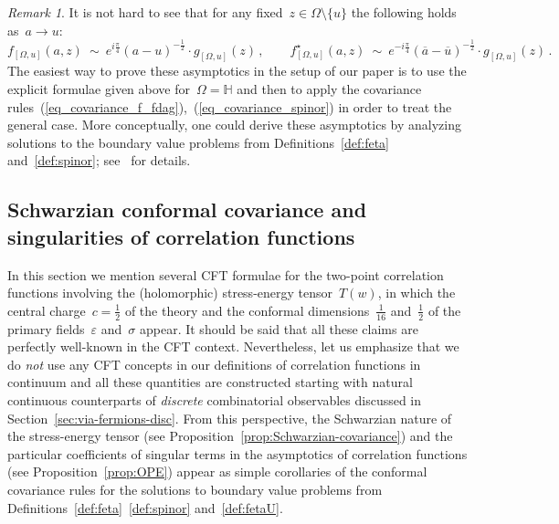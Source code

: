 \documentclass[reqno,11pt,a4paper]{amsart}
\theoremstyle{remark}
\newtheorem{remark}[proposition]{Remark}
\renewcommand{\H}{\mathbb{H}}
\newcommand{\OmegaU}{{[\Omega,u]}}
\newcommand{\fU}{f_\OmegaU}
\newcommand{\fstarU}{f^\star_\OmegaU}
\newcommand{\spinor}{g_\OmegaU}
\begin{document}
\begin{remark}
\label{rem:f_fdag_to_g}
It is not hard to see that for any fixed~$z\in\Omega\setminus\{u\}$ the following holds as~$a\to u$:
\[
\fU(a,z)\ \sim \ e^{i\frac{\pi}{4}}(a-u)^{-\frac{1}{2}}\cdot \spinor(z)\,,\qquad
\fstarU(a,z)\ \sim \ e^{-i\frac{\pi}{4}}(\overline{a}-\overline{u})^{-\frac{1}{2}}\cdot \spinor(z)\,.
\]
The easiest way to prove these asymptotics in the setup of our paper is to use the explicit formulae given above for~\mbox{$\Omega=\H$} and then to apply the covariance rules~(\ref{eq_covariance_f_fdag}),~(\ref{eq_covariance_spinor}) in order to treat the general case. More conceptually, one could derive these asymptotics by analyzing solutions to the boundary value problems from Definitions~\ref{def:feta} and~\ref{def:spinor}; see~\cite{CheHonIzy21} for details.
\end{remark}


\subsection{Schwarzian conformal covariance and singularities of correlation functions}
\label{sub:Schwarzian+OPE}

In this section we mention several CFT formulae for the two-point correlation functions involving the (holomorphic) stress-energy tensor~$T(w)$, in which the central charge~$c=\frac{1}{2}$ of the theory and the conformal dimensions~$\frac{1}{16}$ and~$\frac{1}{2}$ of the primary fields~$\varepsilon$ and~$\sigma$ appear. It should be said that all these claims are perfectly well-known in the CFT context. Nevertheless, let us emphasize that we do \emph{not} use any CFT concepts in our definitions of correlation functions in continuum and all these quantities are constructed starting with natural continuous counterparts of \emph{discrete} combinatorial observables discussed in Section~\ref{sec:via-fermions-disc}. From this perspective, the Schwarzian nature of the stress-energy tensor (see Proposition~\ref{prop:Schwarzian-covariance}) and the particular coefficients of singular terms in the asymptotics of correlation functions (see Proposition~\ref{prop:OPE}) appear as simple corollaries of the conformal covariance rules for the solutions to boundary value problems from Definitions~\ref{def:feta}~\ref{def:spinor} and~\ref{def:fetaU}.
\end{document}
